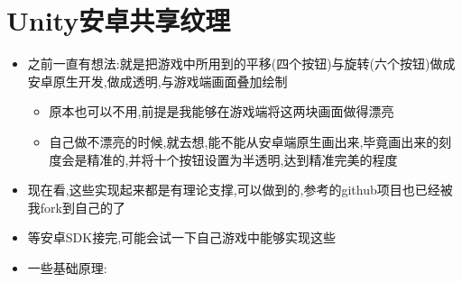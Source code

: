 \documentclass[9pt, b5paper]{article}
\begin{document}
\section{Unity安卓共享纹理}
\label{sec-2}
\begin{itemize}
\item 之前一直有想法:就是把游戏中所用到的平移(四个按钮)与旋转(六个按钮)做成安卓原生开发,做成透明,与游戏端画面叠加绘制
\begin{itemize}
\item 原本也可以不用,前提是我能够在游戏端将这两块画面做得漂亮
\item 自己做不漂亮的时候,就去想,能不能从安卓端原生画出来,毕竟画出来的刻度会是精准的,并将十个按钮设置为半透明,达到精准完美的程度
\end{itemize}
\item 现在看,这些实现起来都是有理论支撑,可以做到的,参考的github项目也已经被我fork到自己的了
\item 等安卓SDK接完,可能会试一下自己游戏中能够实现这些
\item 一些基础原理:
\end{itemize}
\end{document}
